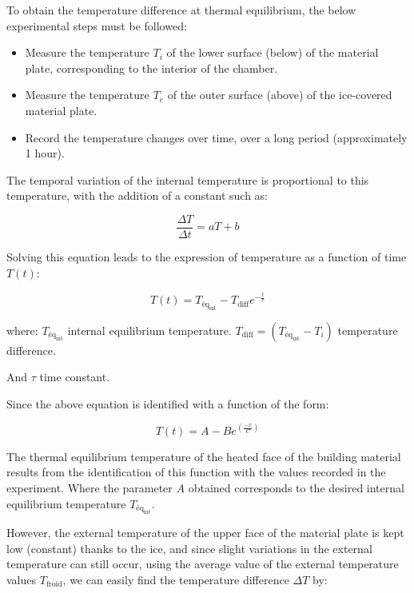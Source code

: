 \documentclass[12pt,a4paper,twoside]{article}
\begin{document}
To obtain the temperature difference at thermal equilibrium, the below experimental steps must be followed:

\begin{itemize}
    \item Measure the temperature $T_i$ of the lower surface (below) of the material plate, corresponding to the interior of the chamber.
    \item Measure the temperature $T_e$ of the outer surface (above) of the ice-covered material plate.
    \item Record the temperature changes over time, over a long period (approximately 1 hour).
\end{itemize}

The temporal variation of the internal temperature is proportional to this temperature, with the addition of a constant such as:

\begin{equation}
\frac{\Delta T}{\Delta t} = aT + b
\end{equation}

Solving this equation leads to the expression of temperature as a function of time $T(t)$:

\begin{equation}
T(t) = T_{\text{éq}_{\text{int}}} - T_{\text{diff}} e^{-\frac{t}{\tau}}
\end{equation}

where: $T_{\text{éq}_{\text{int}}}$ internal equilibrium temperature.  
$T_{\text{diff}} = (T_{\text{éq}_{\text{int}}} - T_i)$ temperature difference.

And $\tau$ time constant.

Since the above equation is identified with a function of the form:

\begin{equation}
T(t) = A - B e^{\left(\frac{-x}{C}\right)}
\end{equation}

The thermal equilibrium temperature of the heated face of the building material results from the identification of this function with the values recorded in the experiment. Where the parameter $A$ obtained corresponds to the desired internal equilibrium temperature $T_{\text{éq}_{\text{int}}}$.

However, the external temperature of the upper face of the material plate is kept low (constant) thanks to the ice, and since slight variations in the external temperature can still occur, using the average value of the external temperature values $T_{\text{froid}}$, we can easily find the temperature difference $\Delta T$ by:
\end{document}
